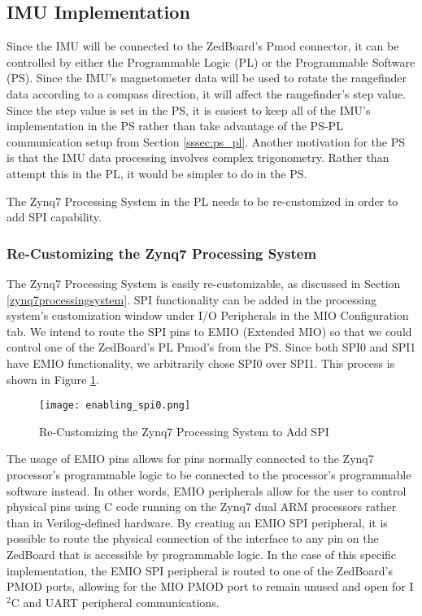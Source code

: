 \subsection{IMU Implementation}
Since the IMU will be connected to the ZedBoard's Pmod connector, it can be controlled by either the Programmable Logic (PL) or the Programmable Software (PS). Since the IMU's magnetometer data will be used to rotate the rangefinder data according to a compass direction, it will affect the rangefinder's step value. Since the step value is set in the PS, it is easiest to keep all of the IMU's implementation in the PS rather than take advantage of the PS-PL communication setup from Section \ref{sssec:ps_pl}. Another motivation for the PS is that the IMU data processing involves complex trigonometry. Rather than attempt this in the PL, it would be simpler to do in the PS.
\par
The Zynq7 Processing System in the PL needs to be re-customized in order to add SPI capability.

\subsubsection{Re-Customizing the Zynq7 Processing System}
The Zynq7 Processing System is easily re-customizable, as discussed in Section \ref{zynq7processingsystem}. SPI functionality can be added in the processing system's customization window under I/O Peripherals in the MIO Configuration tab. We intend to route the SPI pins to EMIO (Extended MIO) so that we could control one of the ZedBoard's PL Pmod's from the PS. Since both SPI0 and SPI1 have EMIO functionality, we arbitrarily chose SPI0 over SPI1. This process is shown in Figure \ref{enabling_spi0}.

\begin{figure}[H]
	\centerline{\texttt{[image: enabling\_spi0.png]}}
	\caption{Re-Customizing the Zynq7 Processing System to Add SPI}
	\label{enabling_spi0}
\end{figure}

\par
The usage of EMIO pins allows for pins normally connected to the Zynq7 processor's programmable logic to be connected to the processor's programmable software instead. In other words, EMIO peripherals allow for the user to control physical pins using C code running on the Zynq7 dual ARM processors rather than in Verilog-defined hardware. By creating an EMIO SPI peripheral, it is possible to route the physical connection of the interface to any pin on the ZedBoard that is accessible by programmable logic. In the case of this specific implementation, the EMIO SPI peripheral is routed to one of the ZedBoard's PMOD ports, allowing for the MIO PMOD port to remain unused and open for I$^2$C and UART peripheral communications.






